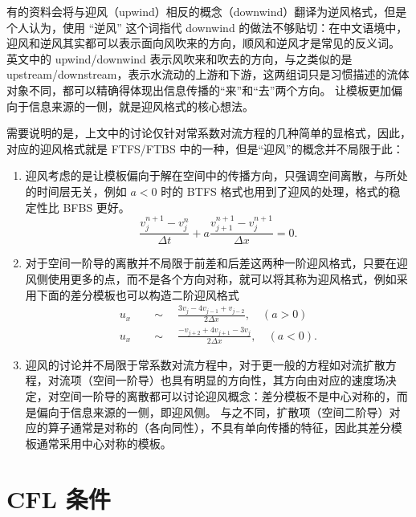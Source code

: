 \begin{remark}
    有的资料会将与迎风（upwind）相反的概念（downwind）翻译为逆风格式，但是个人认为，使用 “逆风” 这个词指代 downwind 的做法不够贴切：在中文语境中，迎风和逆风其实都可以表示面向风吹来的方向，顺风和逆风才是常见的反义词。
    英文中的 upwind/downwind 表示风吹来和吹去的方向，与之类似的是 upstream/downstream，表示水流动的上游和下游，这两组词只是习惯描述的流体对象不同，都可以精确得体现出信息传播的“来”和“去”两个方向。
    让模板更加偏向于信息来源的一侧，就是迎风格式的核心想法。
\end{remark}

\begin{remark}
    需要说明的是，上文中的讨论仅针对常系数对流方程的几种简单的显格式，因此，对应的迎风格式就是 FTFS/FTBS 中的一种，但是“迎风”的概念并不局限于此：
    \begin{enumerate}
        \item 迎风考虑的是让模板偏向于解在空间中的传播方向，只强调空间离散，与所处的时间层无关，例如 $a < 0$ 时的 BTFS 格式也用到了迎风的处理，格式的稳定性比 BFBS 更好。
              \[
                  \frac{v^{n+1}_j - v_j^n}{\Delta t} + a \frac{v_{j+1}^{n+1} - v_{j}^{n+1}}{\Delta x} = 0.
              \]

        \item 对于空间一阶导的离散并不局限于前差和后差这两种一阶迎风格式，只要在迎风侧使用更多的点，而不是各个方向对称，就可以将其称为迎风格式，例如采用下面的差分模板也可以构造二阶迎风格式
              \begin{align*}
                  u_x & \quad\sim\quad \frac{3 v_j - 4 v_{j-1} + v_{j-2}}{2 \Delta x}, \quad (a > 0)    \\
                  u_x & \quad\sim\quad \frac{-v_{j+2} + 4 v_{j+1} - 3 v_{j}}{2 \Delta x}, \quad (a < 0).
              \end{align*}

        \item 迎风的讨论并不局限于常系数对流方程中，对于更一般的方程如对流扩散方程，对流项（空间一阶导）也具有明显的方向性，其方向由对应的速度场决定，对空间一阶导的离散都可以讨论迎风概念：差分模板不是中心对称的，而是偏向于信息来源的一侧，即迎风侧。
              与之不同，扩散项（空间二阶导）对应的算子通常是对称的（各向同性），不具有单向传播的特征，因此其差分模板通常采用中心对称的模板。
    \end{enumerate}
\end{remark}


\section{CFL 条件}

